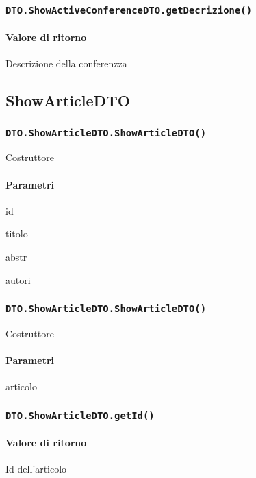 \subsubsection{\texttt{DTO.ShowActiveConferenceDTO.getDecrizione()}}
\paragraph{Valore di ritorno}
\begin{description}
\item Descrizione della conferenzza
\end{description}

\subsection{ShowArticleDTO}
\subsubsection{\texttt{DTO.ShowArticleDTO.ShowArticleDTO()}}
Costruttore
\paragraph{Parametri}
\begin{description}
\item id
\item titolo
\item abstr
\item autori
\end{description}
\subsubsection{\texttt{DTO.ShowArticleDTO.ShowArticleDTO()}}
Costruttore
\paragraph{Parametri}
\begin{description}
\item articolo
\end{description}
\subsubsection{\texttt{DTO.ShowArticleDTO.getId()}}
\paragraph{Valore di ritorno}
\begin{description}
\item Id dell'articolo 
\end{description}
